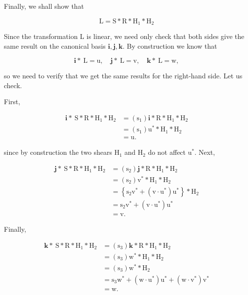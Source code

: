 Finally, we shall show that

$$
\mathrm{L}=\mathrm{S} * \mathrm{R} * \mathrm{H}_{1} * \mathrm{H}_{2}
$$

Since the transformation L is linear, we need only check that both sides give the same result on the canonical basis $\mathbf{i}, \mathbf{j}, \mathbf{k}$. By construction we know that

$$
\mathbf{i} * \mathrm{~L}=\mathrm{u}, \quad \mathbf{j} * \mathrm{~L}=\mathrm{v}, \quad \mathbf{k} * \mathrm{~L}=\mathrm{w},
$$

so we need to verify that we get the same results for the right-hand side. Let us check.

First,

$$
\begin{aligned}
\mathbf{i} * \mathrm{~S} * \mathrm{R} * \mathrm{H}_{1} * \mathrm{H}_{2} &=\left(\mathrm{s}_{1}\right) \mathbf{i} * \mathrm{R} * \mathrm{H}_{1} * \mathrm{H}_{2} \\
&=\left(\mathrm{s}_{1}\right) \mathrm{u}^{*} * \mathrm{H}_{1} * \mathrm{H}_{2} \\
&=\mathrm{u} .
\end{aligned}
$$

since by construction the two shears $\mathrm{H}_{1}$ and $\mathrm{H}_{2}$ do not affect $\mathrm{u}^{*}$. Next,

$$
\begin{aligned}
\mathbf{j} * \mathrm{~S} * \mathrm{R} * \mathrm{H}_{1} * \mathrm{H}_{2} &=\left(\mathrm{s}_{2}\right) \mathbf{j} * \mathrm{R} * \mathrm{H}_{1} * \mathrm{H}_{2} \\
&=\left(\mathrm{s}_{2}\right) \mathrm{v}^{*} * \mathrm{H}_{1} * \mathrm{H}_{2} \\
&=\left\{\mathrm{s}_{2} \mathrm{v}^{*}+\left(\mathrm{v} \cdot \mathrm{u}^{*}\right) \mathrm{u}^{*}\right\} * \mathrm{H}_{2} \\
&=\mathrm{s}_{2} \mathrm{v}^{*}+\left(\mathrm{v} \cdot \mathrm{u}^{*}\right) \mathrm{u}^{*} \\
&=\mathrm{v} .
\end{aligned}
$$

Finally,

$$
\begin{aligned}
\mathbf{k} * \mathrm{~S} * \mathrm{R} * \mathrm{H}_{1} * \mathrm{H}_{2} &=\left(\mathrm{s}_{3}\right) \mathbf{k} * \mathrm{R} * \mathrm{H}_{1} * \mathrm{H}_{2} \\
&=\left(\mathrm{s}_{3}\right) \mathrm{w}^{*} * \mathrm{H}_{1} * \mathrm{H}_{2} \\
&=\left(\mathrm{s}_{3}\right) \mathrm{w}^{*} * \mathrm{H}_{2} \\
&=\mathrm{s}_{3} \mathrm{w}^{*}+\left(\mathrm{w} \cdot \mathrm{u}^{*}\right) \mathrm{u}^{*}+\left(\mathrm{w} \cdot \mathrm{v}^{*}\right) \mathrm{v}^{*} \\
&=\mathrm{w} .
\end{aligned}
$$

